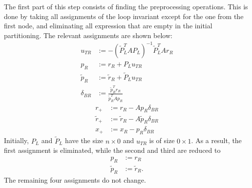 The first part of this step consists of finding the preprocessing operations. This is done by taking all assignments of the loop invariant except for the one from the first node, and eliminating all expression that are empty in the initial partitioning. The relevant assignments are shown below:
%
\begin{align*}
u_{TR} &:= - \left( \tilde{P}_L^T A P_L \right)^{-1} \tilde{P}_L^T A r_R \\
p_R &:= r_R +  P_L u_{TR} \\
\tilde{p}_R &:= \tilde{r}_R + \tilde{P}_L u_{TR} \\
\delta_{BR} &:= \frac{\tilde{p}_R^T r_R}{\tilde{p}_R^T A p_R}
\end{align*}
%
\begin{align*}
r_+ &:= r_R -  A p_R \delta_{BR} \\
\tilde{r}_+ &:= \tilde{r}_R - A \tilde{p}_R \delta_{BR} \\
x_+ & := x_R -  p_R \delta_{BR}
\end{align*}
%
Initially, $P_L$ and $\tilde{P}_L$ have the size $n \times 0$ and $u_{TR}$ is of size $0 \times 1$. As a result, the first assignment is eliminated, while the second and third are reduced to
%
\begin{align*}
p_R &:= r_R \\
\tilde{p}_R &:= \tilde{r}_R \text{.}
\end{align*}
%
The remaining four assignments do not change.

